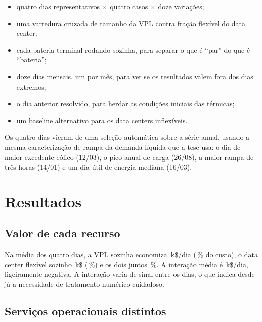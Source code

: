 \documentclass[11pt,a4paper]{article}
\begin{document}
\begin{itemize}
\item quatro dias representativos $\times$ quatro casos $\times$ doze variações;
\item uma varredura cruzada de tamanho da VPL contra fração flexível do data center;
\item cada bateria terminal rodando sozinha, para separar o que é ``par'' do que é ``bateria'';
\item doze dias mensais, um por mês, para ver se os resultados valem fora dos dias extremos;
\item o dia anterior resolvido, para herdar as condições iniciais das térmicas;
\item um baseline alternativo para os data centers inflexíveis.
\end{itemize}

Os quatro dias vieram de uma seleção automática sobre a série anual, usando a mesma caracterização de
rampa da demanda líquida que a tese usa: o dia de maior excedente eólico (12/03), o pico anual de carga
(26/08), a maior rampa de três horas (14/01) e um dia útil de energia mediana (16/03).

\section{Resultados}

\subsection{Valor de cada recurso}

\begin{table}[htbp]
\centering\small
\caption{Custo operacional (k\$/dia) e benefícios, com 50\,\% de renovável. $\Delta$ é a economia em
relação ao caso A; $I$ é a interação da equação~\eqref{eq:I}.}
\tabcustodia
\end{table}

Na média dos quatro dias, a VPL sozinha economiza \numparpar{}\,k\$/dia (\numredB{}\,\% do custo), o
data center flexível sozinho \numdCplano{}\,k\$ (\numredC{}\,\%) e os dois juntos \numredD{}\,\%. A
interação média é \numIbase{}\,k\$/dia, ligeiramente negativa. A interação varia de sinal entre os dias, o que indica desde já a necessidade de tratamento numérico
cuidadoso.

\subsection{Serviços operacionais distintos}
\end{document}
